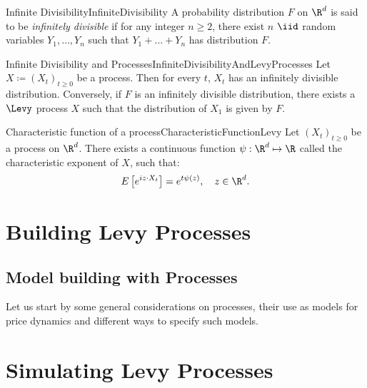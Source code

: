
\begin{defn}{Infinite Divisibility}{InfiniteDivisibility}
	A probability distribution \(F\) on \(\R^d\) is said to be \textit{infinitely divisible} if for any integer \(n \ge 2\), there exist \(n\) \(\iid\) random variables \(Y_1, \dots, Y_n\) such that \(Y_1 + \dots + Y_n\) has distribution \(F\).
\end{defn}

\begin{prop}{Infinite Divisibility and \Levy{} Processes}{InfiniteDivisibilityAndLevyProcesses}
	Let \(X \coloneqq (X_t)_{t \ge 0}\) be a  \Levy{} process. Then for every \(t\), \(X_t\) has an infinitely divisible distribution. Conversely, if \(F\) is an infinitely divisible distribution, there exists a \(\Levy\) process \(X\) such that the distribution of \(X_1\) is given by \(F\).
\end{prop}

\begin{prop}{Characteristic function of a \Levy{} process}{CharacteristicFunctionLevy}
	Let \((X_t)_{t\geq 0}\) be a \Levy{} process on \(\R^d\). There exists a continuous function \(\psi : \R^d \mapsto \R\) called the characteristic exponent of \(X\), such that:
	\begin{equation}\label{eq:CharacteristicFunction}
		E\left[e^{iz \cdot X_t}\right] = e^{t\psi(z)}, \quad z \in \R^d.
	\end{equation}
\end{prop}



\section{Building Levy Processes}

\subsection{Model building with \Levy{} Processes}
Let us start by some general considerations on \Levy{} processes, their use as models for price dynamics and different ways to specify such models.
\section{Simulating Levy Processes}



